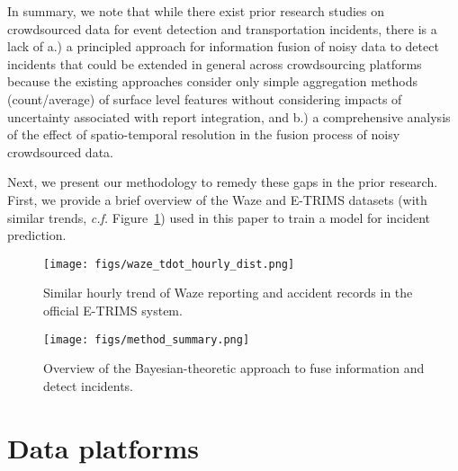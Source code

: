 \documentclass[conference]{IEEEtran}
\begin{document}
In summary, we note that while there exist prior research studies on crowdsourced data for event detection and transportation incidents, there is a lack of
a.) a principled approach for information fusion of noisy data to detect incidents that could be extended in general across crowdsourcing platforms because the existing approaches consider only simple aggregation methods (count/average) of surface level features without considering impacts of uncertainty associated with report integration, and 
b.) a comprehensive analysis of the effect of spatio-temporal resolution in the fusion process of noisy crowdsourced data.

Next, we present our methodology to remedy these gaps in the prior research. First, we provide a brief overview of the Waze and E-TRIMS datasets (with similar trends, \textit{c.f.} Figure~\ref{fig:waze_tdot_hourly_dist}) used in this paper to train a model for incident prediction.     

\begin{figure}[ht!]
    \vspace{-0.15in}
    \centering
    \texttt{[image: figs/waze\_tdot\_hourly\_dist.png]}
    \vspace{-0.15in}
    \caption{Similar hourly trend of Waze reporting and accident records in the  official E-TRIMS system.} 
    \vspace{-0.15in}
    \label{fig:waze_tdot_hourly_dist}
\end{figure}

\begin{figure*}[ht!]
    \centering
    \texttt{[image: figs/method\_summary.png]}
    \caption{Overview of the Bayesian-theoretic approach to fuse information and detect incidents.} 
    \label{fig:overview}
    \vspace{-0.1in}
\end{figure*}

\section{Data platforms}
\label{sec:data}
\end{document}
